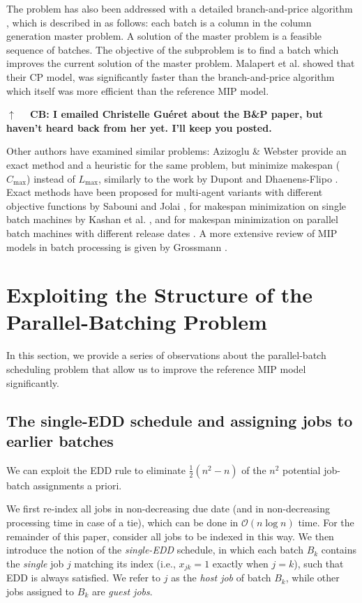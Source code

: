 \documentclass[oribibl]{llncs}
\def\Lmax{{L_{\mathrm{max}}}}
\begin{document}
The problem has also been addressed with a detailed branch-and-price
algorithm \cite{Daste1}, which is described in \cite{Malapert} as
follows: each batch is a column in the column generation master
problem. A solution of the master problem is a feasible sequence of
batches. The objective of the subproblem is to find a batch which
improves the current solution of the master problem. Malapert et al.
\cite{Malapert} showed that their CP model, was significantly faster
than the branch-and-price algorithm which itself was more efficient 
than the reference MIP model. 

\textbf{$\uparrow\quad$ CB: I emailed Christelle Guéret about the B\&P paper,
but haven't heard back from her yet. I'll keep you posted.}

Other authors have examined similar problems: Azizoglu \& Webster
\cite{Azizoglu} provide an exact method and a heuristic for the same
problem, but minimize makespan ($C_\mathrm{max}$) instead of $\Lmax$,
similarly to the work by Dupont and Dhaenens-Flipo \cite{Dupont}.
Exact methods have been proposed for multi-agent variants
with different objective functions by Sabouni and Jolai \cite{Sabouni},
for makespan minimization on single batch machines by Kashan et al.
\cite{Kashan}, and for makespan minimization on parallel batch machines
with different release dates \cite{Ozturk}. A more
extensive review of MIP models in batch processing is given
by Grossmann \cite{Grossmann}. 

\section{Exploiting the Structure of the Parallel-Batching Problem}
\label{sec:propositions}

In this section, we provide a series of observations about the
parallel-batch scheduling problem that allow us to improve the reference MIP
model significantly.

\subsection{The single-EDD schedule and assigning jobs to earlier batches}
We can exploit the EDD rule to eliminate $\frac{1}{2}(n^2 - n)$ of the
$n^2$ potential job-batch assignments a priori.

We first re-index all jobs in non-decreasing due date (and in
non-decreasing processing time in case of a tie), which can be done in
$\mathcal{O}(n \log n)$ time. For the remainder of this paper, consider
all jobs to be indexed in this way. We then introduce the notion of
the \textit{single-EDD} schedule, in which each batch $B_k$ contains the
\textit{single} job $j$ matching its index (i.e., $x_{jk}=1$ exactly when
$j=k$), such that EDD is always satisfied. We refer to $j$ as the \textit{host
job} of batch $B_k$, while other jobs assigned to $B_k$ are \textit{guest jobs}.
\end{document}
